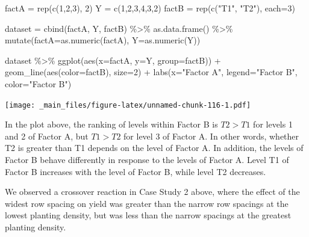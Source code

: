\documentclass[
]{book}
\newenvironment{Shaded}{\begin{snugshade}}{\end{snugshade}}
\newcommand{\AttributeTok}[1]{\textcolor[rgb]{0.77,0.63,0.00}{#1}}
\newcommand{\DecValTok}[1]{\textcolor[rgb]{0.00,0.00,0.81}{#1}}
\newcommand{\FunctionTok}[1]{\textcolor[rgb]{0.00,0.00,0.00}{#1}}
\newcommand{\NormalTok}[1]{#1}
\newcommand{\OtherTok}[1]{\textcolor[rgb]{0.56,0.35,0.01}{#1}}
\newcommand{\SpecialCharTok}[1]{\textcolor[rgb]{0.00,0.00,0.00}{#1}}
\newcommand{\StringTok}[1]{\textcolor[rgb]{0.31,0.60,0.02}{#1}}
\begin{document}
\begin{Shaded}
\begin{Highlighting}[]
\NormalTok{factA }\OtherTok{=} \FunctionTok{rep}\NormalTok{(}\FunctionTok{c}\NormalTok{(}\DecValTok{1}\NormalTok{,}\DecValTok{2}\NormalTok{,}\DecValTok{3}\NormalTok{), }\DecValTok{2}\NormalTok{)}
\NormalTok{Y }\OtherTok{=} \FunctionTok{c}\NormalTok{(}\DecValTok{1}\NormalTok{,}\DecValTok{2}\NormalTok{,}\DecValTok{3}\NormalTok{,}\DecValTok{4}\NormalTok{,}\DecValTok{3}\NormalTok{,}\DecValTok{2}\NormalTok{)}
\NormalTok{factB }\OtherTok{=} \FunctionTok{rep}\NormalTok{(}\FunctionTok{c}\NormalTok{(}\StringTok{"T1"}\NormalTok{, }\StringTok{"T2"}\NormalTok{), }\AttributeTok{each=}\DecValTok{3}\NormalTok{)}

\NormalTok{dataset }\OtherTok{=} \FunctionTok{cbind}\NormalTok{(factA, Y, factB) }\SpecialCharTok{\%\textgreater{}\%}
  \FunctionTok{as.data.frame}\NormalTok{() }\SpecialCharTok{\%\textgreater{}\%}
  \FunctionTok{mutate}\NormalTok{(}\AttributeTok{factA=}\FunctionTok{as.numeric}\NormalTok{(factA),}
         \AttributeTok{Y=}\FunctionTok{as.numeric}\NormalTok{(Y)) }

\NormalTok{dataset }\SpecialCharTok{\%\textgreater{}\%}
  \FunctionTok{ggplot}\NormalTok{(}\FunctionTok{aes}\NormalTok{(}\AttributeTok{x=}\NormalTok{factA, }\AttributeTok{y=}\NormalTok{Y, }\AttributeTok{group=}\NormalTok{factB)) }\SpecialCharTok{+}
  \FunctionTok{geom\_line}\NormalTok{(}\FunctionTok{aes}\NormalTok{(}\AttributeTok{color=}\NormalTok{factB), }\AttributeTok{size=}\DecValTok{2}\NormalTok{) }\SpecialCharTok{+}
  \FunctionTok{labs}\NormalTok{(}\AttributeTok{x=}\StringTok{"Factor A"}\NormalTok{, }\AttributeTok{legend=}\StringTok{"Factor B"}\NormalTok{, }\AttributeTok{color=}\StringTok{"Factor B"}\NormalTok{)}
\end{Highlighting}
\end{Shaded}

\texttt{[image: \_main\_files/figure-latex/unnamed-chunk-116-1.pdf]}

In the plot above, the ranking of levels within Factor B is \(T2>T1\) for levels 1 and 2 of Factor A, but \(T1>T2\) for level 3 of Factor A. In other words, whether T2 is greater than T1 depends on the level of Factor A. In addition, the levels of Factor B behave differently in response to the levels of Factor A. Level T1 of Factor B increases with the level of Factor B, while level T2 decreases.

We observed a crossover reaction in Case Study 2 above, where the effect of the widest row spacing on yield was greater than the narrow row spacings at the lowest planting density, but was less than the narrow spacings at the greatest planting density.
\end{document}
